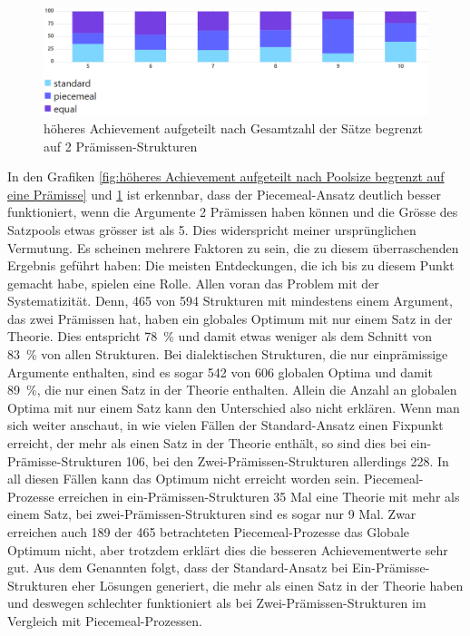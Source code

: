 \documentclass{article}
\begin{document}
\begin{figure}[ht]
  \centering
  \includegraphics[width=\textwidth]{höheres Achievement aufgeteilt nach Poolsize begrenzt auf max 2 Prämissen}
  \caption{höheres Achievement aufgeteilt nach Gesamtzahl der Sätze begrenzt auf 2 Prämissen-Strukturen\label{fig:höheres Achievement aufgeteilt nach Poolsize begrenzt auf max 2 Prämissen}}
\end{figure}

In den Grafiken \ref{fig:höheres Achievement aufgeteilt nach Poolsize begrenzt auf eine Prämisse} und \ref{fig:höheres Achievement aufgeteilt nach Poolsize begrenzt auf max 2 Prämissen} ist erkennbar, dass der Piecemeal-Ansatz deutlich besser funktioniert, wenn die Argumente 2 Prämissen haben können und die Grösse des Satzpools etwas grösser ist als 5. Dies widerspricht meiner ursprünglichen Vermutung. Es scheinen mehrere Faktoren zu sein, die zu diesem überraschenden Ergebnis geführt haben: Die meisten Entdeckungen, die ich bis zu diesem Punkt gemacht habe, spielen eine Rolle. Allen voran das Problem mit der Systematizität. Denn, 465 von 594 Strukturen mit mindestens einem Argument, das zwei Prämissen hat, haben ein globales Optimum mit nur einem Satz in der Theorie. Dies entspricht 78~\% und damit etwas weniger als dem Schnitt von 83~\% von allen Strukturen. Bei dialektischen Strukturen, die nur einprämissige Argumente enthalten, sind es sogar 542 von 606 globalen Optima und damit 89~\%, die nur einen Satz in der Theorie enthalten. Allein die Anzahl an globalen Optima mit nur einem Satz kann den Unterschied also nicht erklären. Wenn man sich weiter anschaut, in wie vielen Fällen der Standard-Ansatz einen Fixpunkt erreicht, der mehr als einen Satz in der Theorie enthält, so sind dies bei ein-Prämisse-Strukturen 106, bei den Zwei-Prämissen-Strukturen allerdings 228. In all diesen Fällen kann das Optimum nicht erreicht worden sein. Piecemeal-Prozesse erreichen in ein-Prämissen-Strukturen 35 Mal eine Theorie mit mehr als einem Satz, bei zwei-Prämissen-Strukturen sind es sogar nur 9 Mal. Zwar erreichen auch 189 der 465 betrachteten Piecemeal-Prozesse das Globale Optimum nicht, aber trotzdem erklärt dies die besseren Achievementwerte sehr gut. Aus dem Genannten folgt, dass der Standard-Ansatz bei Ein-Prämisse-Strukturen eher Lösungen generiert, die mehr als einen Satz in der Theorie haben und deswegen schlechter funktioniert als bei Zwei-Prämissen-Strukturen im Vergleich mit Piecemeal-Prozessen.
\end{document}
